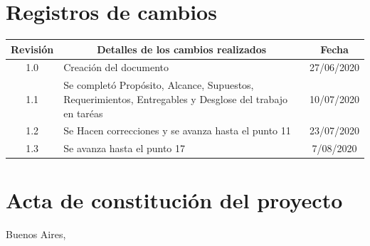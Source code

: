 \documentclass[11pt]{charter}
\begin{document}
\maketitle
\thispagestyle{empty}
\pagebreak


\thispagestyle{empty}
{\setlength{\parskip}{0pt}
\tableofcontents{}
}
\pagebreak


\section{Registros de cambios}
\label{sec:registro}


\begin{table}[ht]
\label{tab:registro}
\centering

\begin{tabularx}{\linewidth}{@{}|c|X|c|@{}}
\hline
\rowcolor[HTML]{C0C0C0} 
Revisión & \multicolumn{1}{c|}{\cellcolor[HTML]{C0C0C0}Detalles de los cambios realizados} & Fecha      \\ \hline

1.0      & Creación del documento          					& 27/06/2020 \\ \hline

1.1      & Se completó Propósito, Alcance, Supuestos, Requerimientos, Entregables y Desglose del trabajo en taréas 								& 10/07/2020 \\ \hline

1.2      & Se Hacen correcciones y se avanza hasta el punto 11 & 23/07/2020 \\ \hline

1.3      & Se avanza hasta el punto 17						 & 7/08/2020 \\ \hline


\end{tabularx}
\end{table}

\pagebreak



\section{Acta de constitución del proyecto}
\label{sec:acta}

\begin{flushright}
Buenos Aires, \fechaInicioName
\end{flushright}
\end{document}
